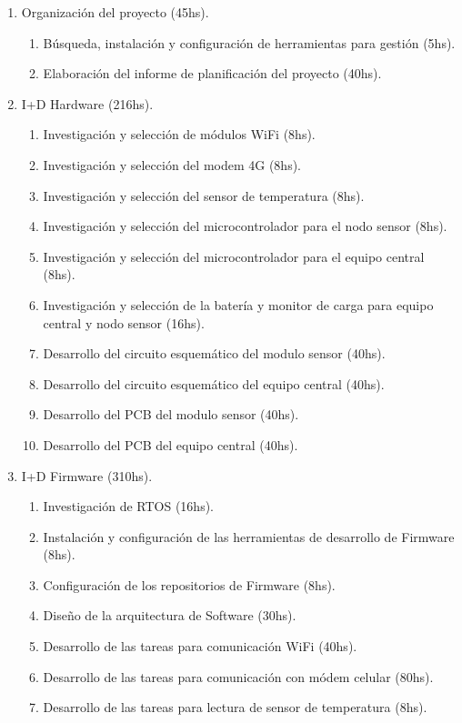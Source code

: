 \documentclass[11pt]{charter}
\begin{document}
\begin{enumerate}
\item Organización del proyecto (45hs).
	\begin{enumerate}
	\item Búsqueda, instalación y configuración de herramientas para gestión (5hs).
	\item Elaboración del informe de planificación del proyecto (40hs).
	\end{enumerate}
\item I+D Hardware (216hs).
	\begin{enumerate}
	\item Investigación y selección de módulos WiFi (8hs).
	\item Investigación y selección del modem 4G (8hs).
	\item Investigación y selección del sensor de temperatura (8hs).
	\item Investigación y selección del microcontrolador para el nodo sensor (8hs).
	\item Investigación y selección del microcontrolador para el equipo central (8hs).
	\item Investigación y selección de la batería y monitor de carga para equipo central y nodo sensor (16hs).
	\item Desarrollo del circuito esquemático del modulo sensor (40hs).
	\item Desarrollo del circuito esquemático del equipo central (40hs).
	\item Desarrollo del PCB del modulo sensor (40hs).
	\item Desarrollo del PCB del equipo central (40hs).
	\end{enumerate}
\item I+D Firmware (310hs).
	\begin{enumerate}
	\item Investigación de RTOS (16hs).
	\item Instalación y configuración de las herramientas de desarrollo de Firmware (8hs).
	\item Configuración de los repositorios de Firmware (8hs).
	\item Diseño de la arquitectura de Software (30hs).
	\item Desarrollo de las tareas para comunicación WiFi (40hs).
	\item Desarrollo de las tareas para comunicación con módem celular (80hs).
	\item Desarrollo de las tareas para lectura de sensor de temperatura (8hs).

\end{enumerate}
\end{enumerate}
\end{document}
